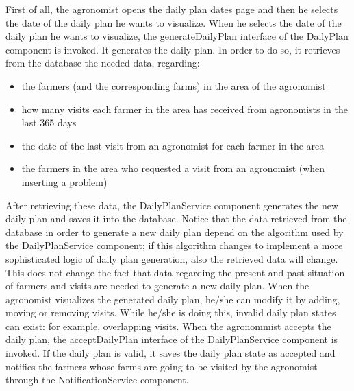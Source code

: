 \documentclass{article}
\begin{document}
First of all, the agronomist opens the daily plan dates page and then he selects the date of the daily plan he wants to visualize. When he selects the date of the daily plan he wants to visualize, the generateDailyPlan interface of the DailyPlan component is invoked. It generates the daily plan. In order to do so, it retrieves from the database the needed data, regarding:
\begin{itemize}
    \item the farmers (and the corresponding farms) in the area of the agronomist
    \item how many visits each farmer in the area has received from agronomists in the last 365 days
    \item the date of the last visit from an agronomist for each farmer in the area
    \item the farmers in the area who requested a visit from an agronomist (when inserting a problem)
\end{itemize}
After retrieving these data, the DailyPlanService component generates the new daily plan and saves it into the database. \newline
Notice that the data retrieved from the database in order to generate a new daily plan depend on the algorithm used by the DailyPlanService component; if this algorithm changes to implement a more sophisticated logic of daily plan generation, also the retrieved data will change. This does not change the fact that data regarding the present and past situation of farmers and visits are needed to generate a new daily plan. \newline
When the agronomist visualizes the generated daily plan, he/she can modify it by adding, moving or removing visits. While he/she is doing this, invalid daily plan states can exist: for example, overlapping visits. \newline
When the agronommist accepts the daily plan, the acceptDailyPlan interface of the DailyPlanService component is invoked. If the daily plan is valid, it saves the daily plan state as accepted and notifies the farmers whose farms are going to be visited by the agronomist through the NotificationService component.\\
\end{document}
